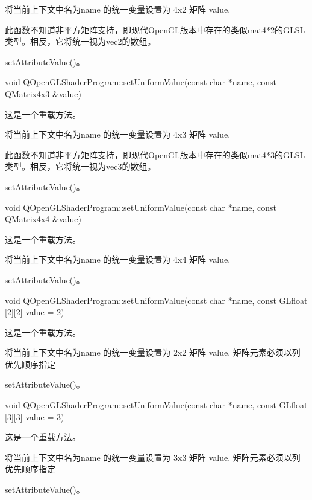 将当前上下文中名为name 的统一变量设置为 4x2 矩阵 value.


\begin{notice}
此函数不知道非平方矩阵支持，即现代OpenGL版本中存在的类似mat4*2的GLSL类型。相反，它将统一视为vec2的数组。
\end{notice}


\begin{seeAlso}
setAttributeValue()。
\end{seeAlso}

void QOpenGLShaderProgram::setUniformValue(const char *name, const QMatrix4x3 \&value)

这是一个重载方法。

将当前上下文中名为name 的统一变量设置为 4x3 矩阵 value.


\begin{notice}
此函数不知道非平方矩阵支持，即现代OpenGL版本中存在的类似mat4*3的GLSL类型。相反，它将统一视为vec3的数组。
\end{notice}

\begin{seeAlso}
setAttributeValue()。
\end{seeAlso}

void QOpenGLShaderProgram::setUniformValue(const char *name, const QMatrix4x4 \&value)

这是一个重载方法。

将当前上下文中名为name 的统一变量设置为 4x4 矩阵 value.


\begin{seeAlso}
setAttributeValue()。
\end{seeAlso}

void QOpenGLShaderProgram::setUniformValue(const char *name, const GLfloat [2][2] value = 2)

这是一个重载方法。

将当前上下文中名为name 的统一变量设置为 2x2 矩阵 value. 矩阵元素必须以列优先顺序指定


\begin{seeAlso}
setAttributeValue()。
\end{seeAlso}

void QOpenGLShaderProgram::setUniformValue(const char *name, const GLfloat [3][3] value = 3)

这是一个重载方法。

将当前上下文中名为name 的统一变量设置为 3x3 矩阵 value. 矩阵元素必须以列优先顺序指定


\begin{seeAlso}
setAttributeValue()。
\end{seeAlso}

